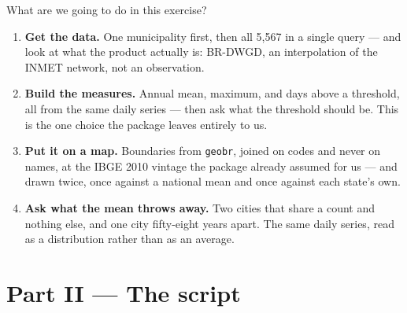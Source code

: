 \documentclass[aspectratio=169,10pt]{beamer}
\newcommand{\code}[1]{\texttt{\small #1}}
\begin{document}
\begin{frame}{What are we going to do in this exercise?}
 
  \begin{enumerate}
    \small
    \item \textbf{Get the data.} One municipality first, then all 5{,}567 in a
          single query --- and look at what the product actually is: BR-DWGD,
          an interpolation of the INMET network, not an observation.
    \item \textbf{Build the measures.} Annual mean, maximum, and days above a
          threshold, all from the same daily series --- then ask what the
          threshold should be. This is the one choice the package leaves
          entirely to us.
    \item \textbf{Put it on a map.} Boundaries from \code{geobr}, joined on
          codes and never on names, at the IBGE 2010 vintage the package
          already assumed for us --- and drawn twice, once against a national
          mean and once against each state's own.
    \item \textbf{Ask what the mean throws away.} Two cities that share a
          count and nothing else, and one city fifty-eight years apart. The
          same daily series, read as a distribution rather than as an average.
  \end{enumerate}
\end{frame}

\section{Part II — The script}

\end{document}
